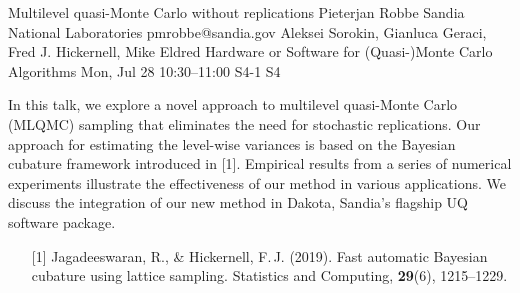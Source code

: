 \begin{talk}
  {Multilevel quasi-Monte Carlo without replications}%
  {Pieterjan Robbe}%
  {Sandia National Laboratories}%
  {pmrobbe@sandia.gov}%
  {Aleksei Sorokin, Gianluca Geraci, Fred J. Hickernell, Mike Eldred}%
  {Hardware or Software for (Quasi-)Monte Carlo Algorithms}%
  {Mon, Jul 28 10:30–11:00}%
  {S4-1}%
  {S4}%
				
			
In this talk, we explore a novel approach to multilevel quasi-Monte Carlo (MLQMC) sampling that eliminates the need for stochastic replications. Our approach for estimating the level-wise variances is based on the Bayesian cubature framework introduced in [1]. Empirical results from a series of numerical experiments illustrate the effectiveness of our method in various applications. We discuss the integration of our new method in Dakota, Sandia's flagship UQ software package.

\medskip

\begin{enumerate}
  \item[{[1]}] Jagadeeswaran, R., \& Hickernell, F.\,J. (2019). Fast automatic Bayesian cubature using lattice sampling. Statistics and Computing, \textbf{29}(6), 1215--1229.
\end{enumerate}

\end{talk}

